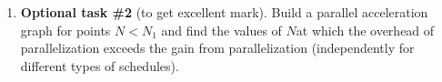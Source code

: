 {\begin{enumerate}
		\item\textbf{Optional task \#2} (to get excellent mark). Build a parallel acceleration graph for points $N<N_1$ and find the values of $N$at which the overhead of parallelization exceeds the gain from parallelization (independently for different types of schedules).
	\end{enumerate}
}